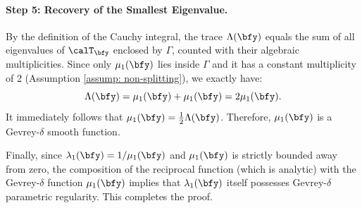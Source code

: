 \paragraph{Step 5: Recovery of the Smallest Eigenvalue.}
By the definition of the Cauchy integral, the trace $\Lambda(\bfy)$ equals the sum of all eigenvalues of $\calT_{\bfy}$ enclosed by $\Gamma$, counted with their algebraic multiplicities. Since only $\mu_1(\bfy)$ lies inside $\Gamma$ and it has a constant multiplicity of 2 (Assumption \ref{assump: non-splitting}), we exactly have:
\begin{equation}
    \Lambda(\bfy) = \mu_1(\bfy) + \mu_1(\bfy) = 2 \mu_1(\bfy).
\end{equation}
It immediately follows that $\mu_1(\bfy) = \frac{1}{2}\Lambda(\bfy)$. Therefore, $\mu_1(\bfy)$ is a Gevrey-$\delta$ smooth function. 

Finally, since $\lambda_1(\bfy) = 1/\mu_1(\bfy)$ and $\mu_1(\bfy)$ is strictly bounded away from zero, the composition of the reciprocal function (which is analytic) with the Gevrey-$\delta$ function $\mu_1(\bfy)$ implies that $\lambda_1(\bfy)$ itself possesses Gevrey-$\delta$ parametric regularity. This completes the proof.


